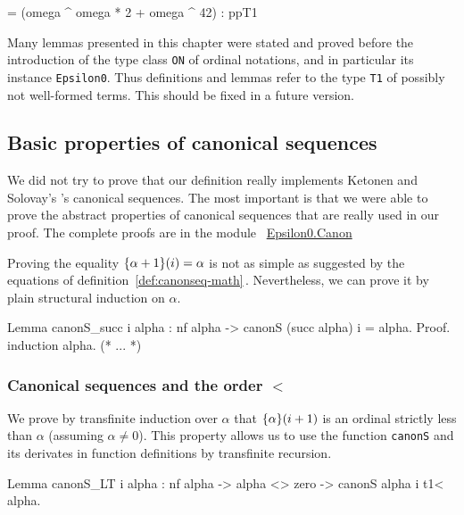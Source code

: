 \documentclass[a4paper]{book}
\begin{document}
\begin{Coqanswer}
    = (omega ^ omega * 2 + omega ^ 42)%
     : ppT1
\end{Coqanswer}

\begin{project}
Many lemmas presented in this chapter were stated and proved before the introduction of 
the type class \texttt{ON} of ordinal notations, and in particular its  instance \texttt{Epsilon0}.
Thus definitions and lemmas refer to the type \texttt{T1} of possibly not well-formed terms.
This should be fixed in  a future version.
\end{project}


\subsection{Basic properties of canonical sequences}

We did not  try to prove that our definition really implements Ketonen and Solovay's  \cite{KS81}'s canonical sequences. The most important is that we were able to prove the 
abstract properties  of canonical sequences that are really used in our proof. The complete proofs are in the module
~\href{../src/html/hydras.Epsilon0.Canon.html}{Epsilon0.Canon}


Proving the equality $\mbox{$\{\alpha+1\}(i)$}=\alpha$ is not 
as simple as suggested by the equations of definition~\ref{def:canonseq-math}\,.
Nevertheless, we can prove it by  plain structural induction on $\alpha$.

\begin{Coqsrc}
Lemma canonS_succ i alpha :
  nf alpha ->  canonS (succ alpha) i = alpha.
Proof.
 induction alpha.
 (* ... *)
\end{Coqsrc}

\subsubsection{Canonical sequences and the order $<$}


We prove by transfinite induction over $\alpha$ that $\mbox{$\{\alpha\}(i+1)$}$ is an ordinal strictly less than $\alpha$ (assuming $\alpha\not=0$). This property allows us to use the function \texttt{canonS} and its derivates in function definitions by transfinite recursion.

\label{lemma:canonS_LT}
\begin{Coqsrc}
Lemma canonS_LT i alpha :
  nf alpha -> alpha <> zero -> canonS alpha i t1<  alpha.
\end{Coqsrc}
\end{document}
